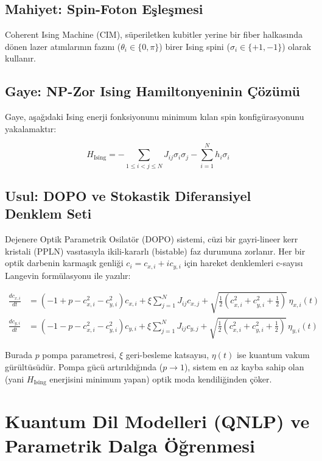 \documentclass[11pt, a4paper]{article}
\begin{document}
\subsection{Mahiyet: Spin-Foton Eşleşmesi}
Coherent Ising Machine (CIM), süperiletken kubitler yerine bir fiber halkasında dönen lazer atımlarının fazını ($\theta_i \in \{0, \pi\}$) birer Ising spini ($\sigma_i \in \{+1, -1\}$) olarak kullanır.

\subsection{Gaye: NP-Zor Ising Hamiltonyeninin Çözümü}
Gaye, aşağıdaki Ising enerji fonksiyonunu minimum kılan spin konfigürasyonunu yakalamaktır:

\begin{equation}
H_{\text{Ising}} = -\sum_{1 \le i < j \le N} J_{ij} \sigma_i \sigma_j - \sum_{i=1}^N h_i \sigma_i
\end{equation}

\subsection{Usul: DOPO ve Stokastik Diferansiyel Denklem Seti}
Dejenere Optik Parametrik Osilatör (DOPO) sistemi, cüzi bir gayri-lineer kerr kristali (PPLN) vasıtasıyla ikili-kararlı (bistable) faz durumuna zorlanır. Her bir optik darbenin karmaşık genliği $c_i = c_{x,i} + i c_{y,i}$ için hareket denklemleri c-sayısı Langevin formülasyonu ile yazılır:

\begin{align}
\frac{d c_{x,i}}{dt} &= \left( -1 + p - c_{x,i}^2 - c_{y,i}^2 \right) c_{x,i} + \xi \sum_{j=1}^N J_{ij} c_{x,j} + \sqrt{\frac{1}{2}\left(c_{x,i}^2 + c_{y,i}^2 + \frac{1}{2}\right)} \, \eta_{x,i}(t) \\
\frac{d c_{y,i}}{dt} &= \left( -1 - p - c_{x,i}^2 - c_{y,i}^2 \right) c_{y,i} + \xi \sum_{j=1}^N J_{ij} c_{y,j} + \sqrt{\frac{1}{2}\left(c_{x,i}^2 + c_{y,i}^2 + \frac{1}{2}\right)} \, \eta_{y,i}(t)
\end{align}

Burada $p$ pompa parametresi, $\xi$ geri-besleme katsayısı, $\eta(t)$ ise kuantum vakum gürültüsüdür. Pompa gücü artırıldığında ($p \to 1$), sistem en az kayba sahip olan (yani $H_{\text{Ising}}$ enerjisini minimum yapan) optik moda kendiliğinden çöker.

\section{Kuantum Dil Modelleri (QNLP) ve Parametrik Dalga Öğrenmesi}
\end{document}
